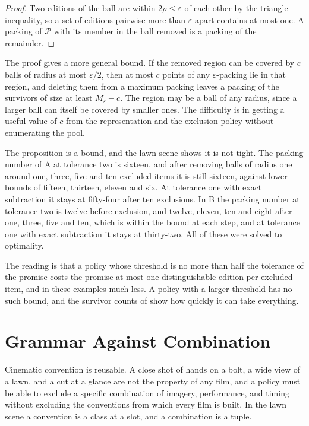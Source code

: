 \documentclass[11pt,twoside,openright]{book}
\theoremstyle{plain}
\theoremstyle{definition}
\theoremstyle{remark}
\begin{document}
\begin{proof}
Two editions of the ball are within $2\rho\le\varepsilon$ of each other by the triangle inequality, so a set of editions pairwise more than $\varepsilon$ apart contains at most one. A packing of $\mathcal P$ with its member in the ball removed is a packing of the remainder.
\end{proof}

The proof gives a more general bound. If the removed region can be covered by $c$ balls of radius at most $\varepsilon/2$, then at most $c$ points of any $\varepsilon$-packing lie in that region, and deleting them from a maximum packing leaves a packing of the survivors of size at least $M_\varepsilon-c$. The region may be a ball of any radius, since a larger ball can itself be covered by smaller ones. The difficulty is in getting a useful value of $c$ from the representation and the exclusion policy without enumerating the pool.

The proposition is a bound, and the lawn scene shows it is not tight. The packing number of A at tolerance two is sixteen, and after removing balls of radius one around one, three, five and ten excluded items it is still sixteen, against lower bounds of fifteen, thirteen, eleven and six. At tolerance one with exact subtraction it stays at fifty-four after ten exclusions. In B the packing number at tolerance two is twelve before exclusion, and twelve, eleven, ten and eight after one, three, five and ten, which is within the bound at each step, and at tolerance one with exact subtraction it stays at thirty-two. All of these were solved to optimality.

The reading is that a policy whose threshold is no more than half the tolerance of the promise costs the promise at most one distinguishable edition per excluded item, and in these examples much less. A policy with a larger threshold has no such bound, and the survivor counts of  show how quickly it can take everything.

\section{Grammar Against Combination}\label{sec:grammar15}

Cinematic convention is reusable. A close shot of hands on a bolt, a wide view of a lawn, and a cut at a glance are not the property of any film, and a policy must be able to exclude a specific combination of imagery, performance, and timing without excluding the conventions from which every film is built. In the lawn scene a convention is a class at a slot, and a combination is a tuple.
\end{document}
